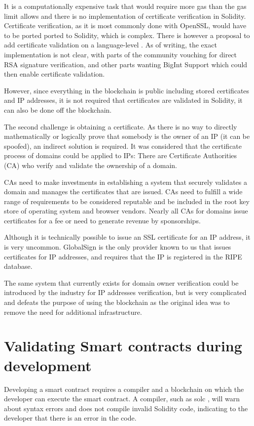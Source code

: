 It is a computationally expensive task that would require more gas than the gas limit allows and there is no implementation of certificate verification in Solidity. Certificate verification, as it is most commonly done with OpenSSL, would have to be ported ported to Solidity, which is complex.
There is however a proposal to add certificate validation on a language-level \cite{EIP74}. As of writing, the exact implementation is not clear, with parts of the community vouching for direct RSA signature verification, and other parts wanting BigInt Support which could then enable certificate validation.

However, since everything in the blockchain is public including stored certificates and IP addresses, it is not required that certificates are validated in Solidity, it can also be done off the blockchain. 

The second challenge is obtaining a certificate. As there is no way to directly mathematically or logically prove that somebody is the owner of an IP (it can be spoofed), an indirect solution is required. It was considered that the certificate process of domains could be applied to IPs: There are Certificate Authorities (CA) who verify and validate the ownership of a domain.

CAs need to make investments in establishing a system that securely validates a domain and manages the certificates that are issued. CAs need to fulfill a wide range of requirements \cite{BaselineRequirements} to be considered reputable and be included in the root key store of operating system and browser vendors. Nearly all CAs for domains issue certificates for a fee or need to generate revenue by sponsorships.

Although it is technically possible to issue an SSL certificate for an IP address, it is very uncommon. GlobalSign \cite{GlobalSign} is the only provider known to us that issues certificates for IP addresses, and requires that the IP is registered in the RIPE database.

The same system that currently exists for domain owner verification could be introduced by the industry for IP addresses verification, but is very complicated and defeats the purpose of using the blockchain as the original idea was to remove the need for additional infrastructure.

\section{Validating Smart contracts during development}
Developing a smart contract requires a compiler and a blockchain on which the developer can execute the smart contract. A compiler, such as solc \cite{Solc}, will warn about syntax errors and does not compile invalid Solidity code, indicating to the developer that there is an error in the code.

